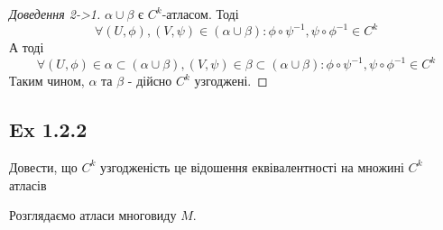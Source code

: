 \documentclass[10pt, a4paper]{article} %
\begin{document}
\begin{proof}[Доведення 2->1]
    $\alpha\cup\beta$ є $C^k$-атласом.
    Тоді 
    \[\forall (U,\phi),(V,\psi) \in (\alpha\cup\beta): \phi \circ \psi^{-1}, \psi \circ \phi^{-1} \in C^k\]
    А тоді 
    \[\forall (U,\phi) \in \alpha\subset (\alpha\cup\beta), (V,\psi) \in \beta \subset (\alpha\cup\beta): \phi \circ \psi^{-1}, \psi \circ \phi^{-1} \in C^k\]
    Таким чином, $\alpha$ та $\beta$ - дійсно $C^k$ узгоджені.
\end{proof}

\subsection*{Ex 1.2.2}
\begin{mdframed}
    Довести, що $C^k$ узгодженість це відошення еквівалентності на множині $C^k$ атласів
\end{mdframed}
Розглядаємо атласи многовиду $M$.
\end{document}
